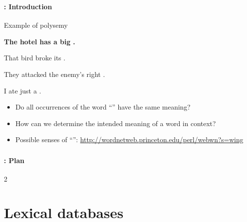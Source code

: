 \documentclass[xcolor=table]{beamer}
\subtitle[07- Word semantics]{Chapter 07\\Word semantics}
\begin{document}
	
\begin{frame}
	\frametitle{\inserttitle}
	\framesubtitle{\insertshortsubtitle: Introduction}

	\begin{exampleblock}{Example of polysemy}
		\begin{center}
			\Large\bfseries
				The hotel has a big .
				 
				That bird broke its .
				
				They attacked the enemy's right .
				
				I ate just a .
		\end{center}
	\end{exampleblock}
	
	\begin{itemize}
		\item Do all occurrences of the word ``'' have the same meaning?
		\item How can we determine the intended meaning of a word in context?
		\item Possible senses of ``'': \url{http://wordnetweb.princeton.edu/perl/webwn?s=wing}
	\end{itemize}

\end{frame}

\begin{frame}
	\frametitle{\inserttitle}
	\framesubtitle{\insertshortsubtitle: Plan}

	\begin{multicols}{2}
	\tableofcontents
	\end{multicols}

\end{frame}

\section{Lexical databases}
\end{document}

